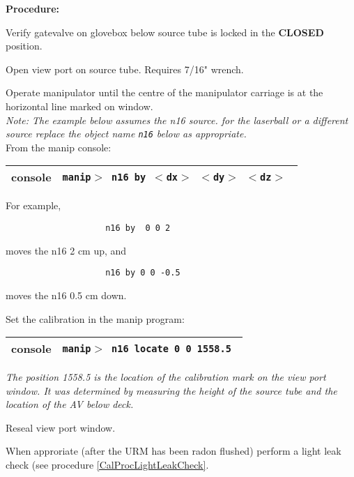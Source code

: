 \noindent
{\bf Procedure:}
\begin{enumerate}
\checkitem Verify gatevalve  on glovebox below source tube is
  locked in the {\bf CLOSED} position.

\checkitem Open view port on source tube.  Requires 7/16" wrench.

\checkitem Operate manipulator until the centre of the manipulator
      carriage is at the horizontal line marked on window.\\
      {\small\em Note: The example below 
       assumes the n16 source.  for the laserball or
        a different source replace the object name {\tt n16} below as
        appropriate.}\\
      From the manip console:
  \begin{center}
  \begin{tabular}{|l|l|}
  \hline
  console & {\tt manip$>$ n16 by $<$dx$>$ $<$dy$>$ $<$dz$>$ } \\
  \hline
  \end{tabular}
  \end{center}  
  For example,
  \begin{verbatim}
                    n16 by  0 0 2
  \end{verbatim}
        moves the n16 2 cm up, and
   \begin{verbatim}
                    n16 by 0 0 -0.5
   \end{verbatim}
   moves the n16 0.5 cm down.

\checkitem Set the calibration in the manip program:
  \begin{center}
  \begin{tabular}{|l|l|}
  \hline
  console & {\tt manip$>$ n16 locate 0 0 1558.5 } \\
  \hline
  \end{tabular}
  \end{center}  
  \small
  {\em
    The position 1558.5 is the location of the calibration mark on
    the view port window.  It was determined by measuring the height
    of the source tube and the location of the AV below deck.  
  }
  \normalsize

\checkitem Reseal view port window.

\checkitem When approriate (after the URM has been radon flushed) perform
  a light leak check (see procedure \ref{CalProcLightLeakCheck}.

\end{enumerate}


